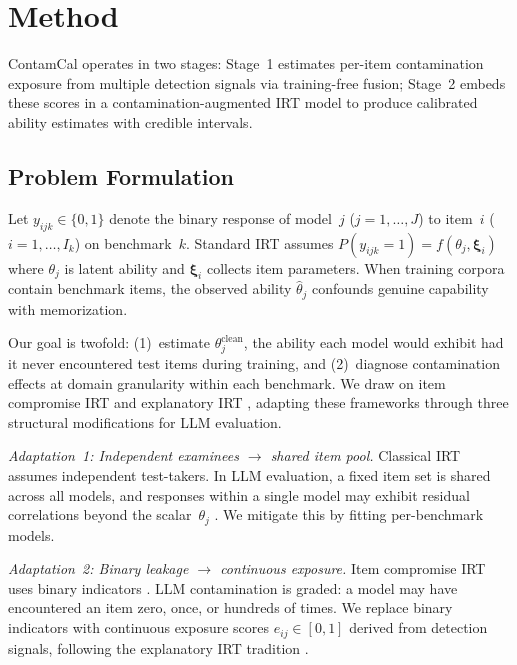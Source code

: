 \section{Method}
\label{sec:method}

ContamCal operates in two stages: Stage~1 estimates per-item contamination exposure from multiple detection signals via training-free fusion; Stage~2 embeds these scores in a contamination-augmented IRT model to produce calibrated ability estimates with credible intervals.

\subsection{Problem Formulation}
\label{sec:formulation}

Let $y_{ijk} \in \{0,1\}$ denote the binary response of model~$j$ ($j=1,\ldots,J$) to item~$i$ ($i=1,\ldots,I_k$) on benchmark~$k$. Standard IRT assumes $P(y_{ijk}=1) = f(\theta_j, \boldsymbol{\xi}_i)$ where $\theta_j$ is latent ability and $\boldsymbol{\xi}_i$ collects item parameters. When training corpora contain benchmark items, the observed ability $\hat{\theta}_j$ confounds genuine capability with memorization.

Our goal is twofold: (1)~estimate $\theta_j^{\text{clean}}$, the ability each model would exhibit had it never encountered test items during training, and (2)~diagnose contamination effects at domain granularity within each benchmark. We draw on item compromise IRT \citep{eckerly_2017_item_compromise,sinharay_2017_preknowledge} and explanatory IRT \citep{deboeck_2004_explanatory_irt}, adapting these frameworks through three structural modifications for LLM evaluation.

\textit{Adaptation~1: Independent examinees $\to$ shared item pool.} Classical IRT assumes independent test-takers. In LLM evaluation, a fixed item set is shared across all models, and responses within a single model may exhibit residual correlations beyond the scalar~$\theta_j$ \citep{sanmartin_2009_irt}. We mitigate this by fitting per-benchmark models.

\textit{Adaptation~2: Binary leakage $\to$ continuous exposure.} Item compromise IRT uses binary indicators \citep{sinharay_2017_preknowledge}. LLM contamination is graded: a model may have encountered an item zero, once, or hundreds of times. We replace binary indicators with continuous exposure scores $e_{ij} \in [0,1]$ derived from detection signals, following the explanatory IRT tradition \citep{deboeck_2004_explanatory_irt}.

